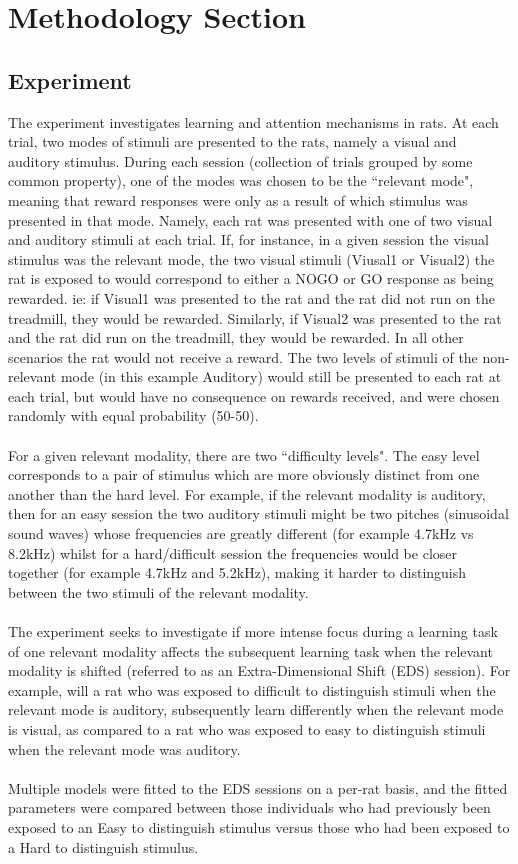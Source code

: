 \documentclass[12pt]{article}
\begin{document}
\section{Methodology Section}
\subsection{Experiment}
The experiment investigates learning and attention mechanisms in rats. At each trial, two modes of stimuli are presented to the rats, namely a visual and auditory stimulus. During each session (collection of trials grouped by some common property), one of the modes was chosen to be the ``relevant mode", meaning that reward responses were only as a result of which stimulus was presented in that mode. Namely, each rat was presented with one of two visual and auditory stimuli at each trial. If, for instance, in a given session the visual stimulus was the relevant mode, the two visual stimuli (Viusal1 or Visual2) the rat is exposed to would correspond to either a NOGO or GO response as being rewarded. ie: if Visual1 was presented to the rat and the rat did not run on the treadmill, they would be rewarded. Similarly, if Visual2 was presented to the rat and the rat did run on the treadmill, they would be rewarded. In all other scenarios the rat would not receive a reward. The two levels of stimuli of the non-relevant mode (in this example Auditory) would still be presented to each rat at each trial, but would have no consequence on rewards received, and were chosen randomly with equal probability (50-50).
\\\\
For a given relevant modality, there are two ``difficulty levels". The easy level corresponds to a pair of stimulus which are more obviously distinct from one another than the hard level. For example, if the relevant modality is auditory, then for an easy session the two auditory stimuli might be two pitches (sinusoidal sound waves) whose frequencies are greatly different (for example 4.7kHz vs 8.2kHz) whilst for a hard/difficult session the frequencies would be closer together (for example 4.7kHz and 5.2kHz), making it harder to distinguish between the two stimuli of the relevant modality.\\\\
The experiment seeks to investigate if more intense focus during a learning task of one relevant modality affects the subsequent learning task when the relevant modality is shifted (referred to as an Extra-Dimensional Shift (EDS) session). For example, will a rat who was exposed to difficult to distinguish stimuli when the relevant mode is auditory, subsequently learn differently when the relevant mode is visual, as compared to a rat who was exposed to easy to distinguish stimuli when the relevant mode was auditory.
\\\\
Multiple models were fitted to the EDS sessions on a per-rat basis, and the fitted parameters were compared between those individuals who had previously been exposed to an Easy to distinguish stimulus versus those who had been exposed to a Hard to distinguish stimulus. 
\end{document}
